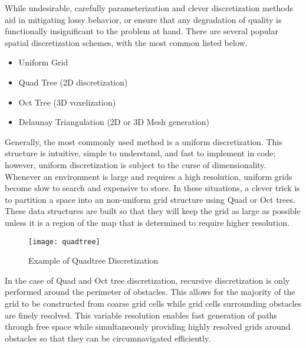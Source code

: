 While undesirable, carefully parameterization and clever discretization methods aid in mitigating lossy behavior, or ensure that any degradation of quality is functionally insignificant to the problem at hand. There are several popular spatial discretization schemes, with the most common listed below. 

\begin{itemize}
  \item Uniform Grid
  \item Quad Tree (2D discretization)
  \item Oct Tree (3D voxelization)
  \item Delaunay Triangulation (2D or 3D Mesh generation)
\end{itemize}


Generally, the most commonly used method is a uniform discretization. This structure is intuitive, simple to understand, and fast to implement in code; however, uniform discretization is subject to the curse of dimensionality. Whenever an environment is large and requires a high resolution, uniform grids become slow to search and expensive to store. In these situations, a clever trick is to partition a space into an non-uniform grid structure using Quad or Oct trees. These data structures are built so that they will keep the grid as large as possible unless it is a region of the map that is determined to require higher resolution. 

\begin{figure}[h!]
  \texttt{[image: quadtree]}
  \centering
  \label{fig:quadtree}
  \caption{Example of Quadtree Discretization}
\end{figure}

In the case of Quad and Oct tree discretization, recursive discretization is only performed around the perimeter of obstacles. This allows for the majority of the grid to be constructed from coarse grid cells while grid cells surrounding obstacles are finely resolved. This variable resolution enables fast generation of paths through free space while simultaneously providing highly resolved grids around obstacles so that they can be circumnavigated efficiently.




